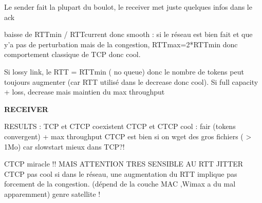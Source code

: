 \documentclass[frenchb]{article}
\begin{document}
Le sender fait la plupart du boulot, le receiver met juste quelques infos dans le ack




baisse de RTTmin / RTTcurrent donc smooth : si le réseau est bien fait et que y'a pas de perturbation mais de la congestion, RTTmax=2*RTTmin donc comportement classique de TCP donc cool.

Si lossy link, le RTT = RTTmin ( no queue) donc le nombre de tokens peut toujours augmenter (car RTT utilisé dans le decrease donc cool). Si full capacity + loss, decrease mais maintien du max throughput

\textbf{RECEIVER}

RESULTS :
TCP et CTCP coexistent
CTCP et CTCP cool : fair (tokens convergent) + max throughput
CTCP est bien si on wget des gros fichiers ( > 1Mo) car slowstart mieux dans TCP?!


CTCP miracle  !! MAIS ATTENTION TRES SENSIBLE AU RTT JITTER
CTCP pas cool si dans le réseau, une augmentation du RTT implique pas forcement de la congestion. (dépend de la couche MAC ,Wimax a du mal apparemment) genre satellite !
\cite{satellite}
\cite{ctcpmulti}
\cite{ctcp}
\cite{tcp/nc}
\cite{tcp/ncthroughput}
\cite{ncmeetstcp}
\cite{tcpmultipath}
\cite{arqfornc}
\cite{memoryanalysis}



\end{document}
